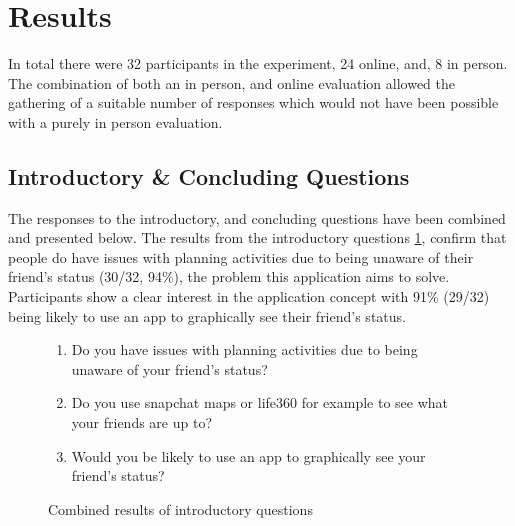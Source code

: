 \section{Results}
In total there were 32 participants in the experiment, 24 online, and, 8 in person. The combination of both an in person, and online evaluation allowed the gathering of a suitable number of responses which would not have been possible with a purely in person evaluation.

\subsection{Introductory \& Concluding Questions}
The responses to the introductory, and concluding questions have been combined and presented below. The results from the introductory questions \ref{fig:introAns}, confirm that people do have issues with planning activities due to being unaware of their friend's status (30/32, 94\%), the problem this application aims to solve. Participants show a clear interest in the application concept with 91\% (29/32) being likely to use an app to graphically see their friend's status. 

\begin{figure}[H]

\begin{enumerate}
    \item Do you have issues with planning activities due to being unaware of your friend's status?
    \item Do you use snapchat maps or life360 for example to see what your friends are up to?
    \item Would you be likely to use an app to graphically see your friend's status?
\end{enumerate}

\caption{Combined results of introductory questions}
\label{fig:introAns}
\end{figure}
\FloatBarrier

